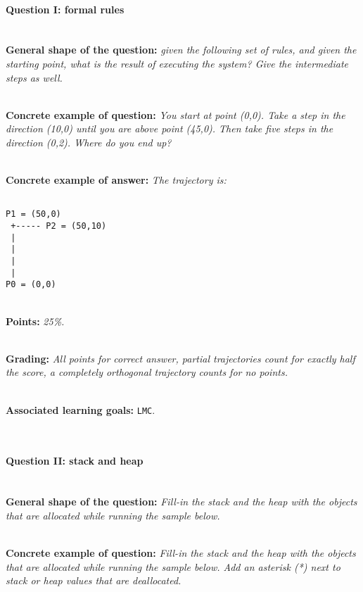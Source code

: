 \documentclass[12pt,a4paper,final]{article}
\begin{document}
\paragraph{Question I: formal rules} \ \\

\textbf{General shape of the question:} \textit{given the following set of rules, and given the starting point, what is the result of executing the system? Give the intermediate steps as well.}

\ \\ 

\textbf{Concrete example of question:} \textit{You start at point (0,0). Take a step in the direction (10,0) until you are above point (45,0). Then take five steps in the direction (0,2). Where do you end up?}

\ \\ 

\textbf{Concrete example of answer:} \textit{The trajectory is:}

\begin{lstlisting}

P1 = (50,0)
 +----- P2 = (50,10)
 |
 |
 |
 |
P0 = (0,0)
\end{lstlisting}

\ \\ 

\textbf{Points:} \textit{25\%.}

\ \\ 

\textbf{Grading:} \textit{All points for correct answer, partial trajectories count for exactly half the score, a completely orthogonal trajectory counts for no points.}

\ \\ 

\textbf{Associated learning goals:} \texttt{LMC}.

\ \\ 

\paragraph{Question II: stack and heap} \ \\ 

\textbf{General shape of the question:} \textit{Fill-in the stack and the heap with the objects that are allocated while running the sample below.}

\ \\ 

\textbf{Concrete example of question:} \textit{Fill-in the stack and the heap with the objects that are allocated while running the sample below. Add an asterisk (*) next to stack or heap values that are deallocated.}
\end{document}
